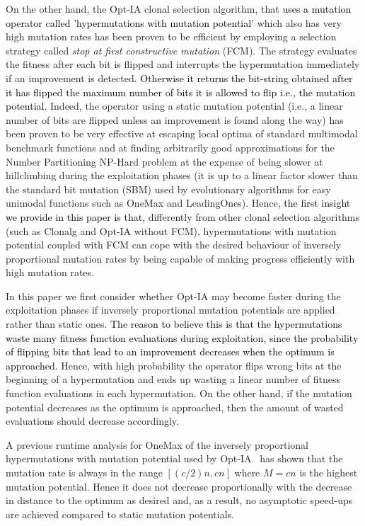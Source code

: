 \documentclass[lettersize,journal]{IEEEtran}
\newcommand{\new}[1]{\textcolor{black}{#1}}
\begin{document}
On the other hand, the Opt-IA clonal selection algorithm, that \new{uses a mutation operator called 'hypermutations with mutation potential'} which also has very high mutation rates has been proven to be efficient by employing a selection strategy called {\it stop at first constructive mutation} (FCM). The strategy evaluates the fitness after each bit is flipped and interrupts the hypermutation immediately if an improvement is detected. \new {Otherwise it returns the bit-string obtained after it has flipped the maximum number of  bits it is allowed to flip i.e., the mutation potential.} 
Indeed, the operator using a static mutation potential (i.e., a linear number of bits are flipped unless an improvement is found along the way) has been proven to be very effective at escaping local
optima of standard multimodal benchmark functions \cite{CorusOlivetoYazdaniGECCO2017} and at finding arbitrarily good approximations for the Number Partitioning NP-Hard problem \cite{CorusOlivetoYazdaniPPSN2018Approx,CorusOlivetoYazdaniAIJ2019} at the expense
of being slower at hillclimbing during the exploitation phases (it is up to a linear factor slower than the standard bit mutation (SBM) used by evolutionary algorithms for easy unimodal functions such as OneMax and LeadingOnes).
Hence, \new{the first insight we provide in this paper is that,} differently from other clonal selection algorithms (such as Clonalg and Opt-IA without FCM), hypermutations with mutation potential coupled with FCM can cope with the desired behaviour of inversely proportional mutation rates by being capable of making progress efficiently with high mutation rates. %

In this paper we first consider whether Opt-IA may become faster during the exploitation phases if inversely proportional mutation potentials are applied rather than static ones.
\new{The reason to believe this is that the hypermutations waste many fitness function evaluations during exploitation, since the probability of flipping bits that lead to an improvement decreases when the optimum is approached.} 
Hence, with high probability the operator flips wrong bits at the beginning of a hypermutation and ends up wasting a linear number
of fitness function evaluations in each hypermutation. On the other hand, if the mutation potential decreases as the optimum is approached, 
then the amount of wasted evaluations should decrease accordingly.

A previous runtime analysis for OneMax of the inversely proportional hypermutations with mutation potential used by Opt-IA~\cite{JansenZarges2011} has shown that the mutation rate is always in the range $[(c/2)n, cn]$ where $M=cn$ is the highest mutation potential. Hence it does not decrease proportionally with the decrease in distance to the optimum as desired and, as a result, no asymptotic speed-ups are achieved compared to static mutation potentials. 
\end{document}
